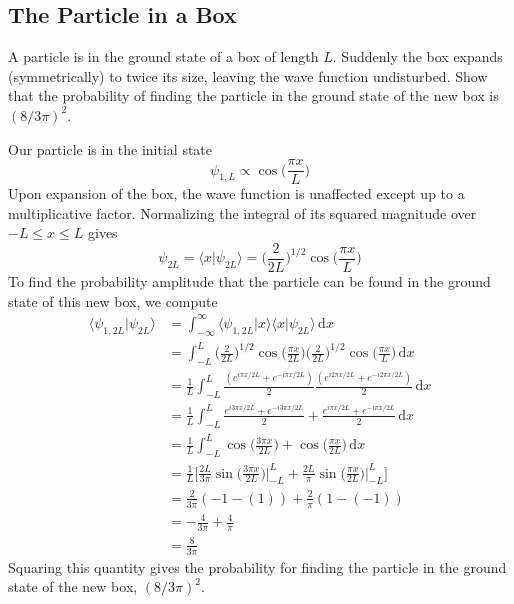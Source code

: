 \documentclass[../principles-of-quantum-mechanics.tex]{subfiles}
\begin{document}
\begin{questions}
	\subsection{The Particle in a Box}
	\question A particle is in the ground state of a box of length $L$. Suddenly the box expands (symmetrically) to twice its size, leaving the wave function undisturbed. Show that the probability of finding the particle in the ground state of the new box is $(8/3\pi)^2$.
	\begin{solution}
		Our particle is in the initial state
		$$\psi_{1, L} \propto \cos\Big(\frac{\pi x}{L}\Big)$$
		Upon expansion of the box, the wave function is unaffected except up to a multiplicative factor. Normalizing the integral of its squared magnitude over $-L\leq x \leq L$ gives 
		$$\psi_{2L} = \langle x | \psi_{2L}\rangle = \Big(\frac{2}{2L}\Big)^{1/2}\cos\Big(\frac{\pi x}{L}\Big)$$
		To find the probability amplitude that the particle can be found in the ground state of this new box, we compute
		\begin{align*}
			\langle\psi_{1, 2L}|\psi_{2L}\rangle &= \int_{-\infty}^{\infty}\langle\psi_{1, 2L}|x\rangle\langle x|\psi_{2L}\rangle\,\mathrm{d}x \\
			&= \int_{-L}^{L}\Big(\frac{2}{2L}\Big)^{1/2}\cos\Big(\frac{\pi x}{2L}\Big)\Big(\frac{2}{2L}\Big)^{1/2}\cos\Big(\frac{\pi x}{L}\Big)\,\mathrm{d}x \\
			&= \frac{1}{L}\int_{-L}^{L}\frac{(e^{i\pi x/2L} + e^{-i\pi x/2L})}{2}\frac{(e^{i2\pi x/2L} + e^{-i2\pi x/2L})}{2}\,\mathrm{d}x \\
			&= \frac{1}{L}\int_{-L}^{L}\frac{e^{i3\pi x / 2L} + e^{-i3\pi x / 2L}}{2} + \frac{e^{i\pi x / 2L} + e^{-i\pi x / 2L}}{2}\,\mathrm{d}x \\
			&= \frac{1}{L}\int_{-L}^{L}\cos\Big(\frac{3\pi x}{2L}\Big) + \cos\Big(\frac{\pi x}{2L}\Big)\,\mathrm{d}x \\
			&= \frac{1}{L}\Big[\frac{2L}{3\pi}\sin\Big(\frac{3\pi x}{2L}\Big)\Big|_{-L}^L + \frac{2L}{\pi}\sin\Big(\frac{\pi x}{2L}\Big)\Big|_{-L}^{L}\Big] \\
			&= \frac{2}{3\pi}(-1 - (1)) + \frac{2}{\pi}(1 - (-1)) \\
			&= -\frac{4}{3\pi} + \frac{4}{\pi} \\
			&= \frac{8}{3\pi}
		\end{align*}
		Squaring this quantity gives the probability for finding the particle in the ground state of the new box, $(8/3\pi)^2$.
	\end{solution}
	

\end{questions}
\end{document}
